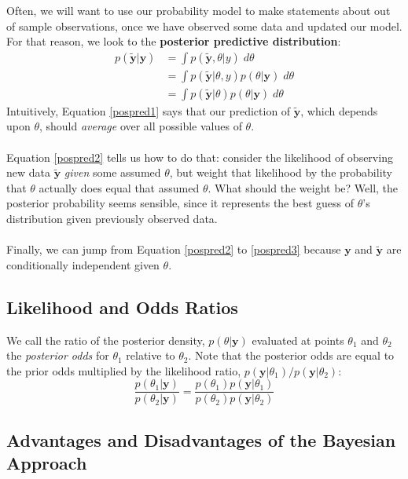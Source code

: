 \documentclass[12pt]{article}
\begin{document}
Often, we will want to use our probability model to make statements
about out of sample observations, once we have observed some data
and updated our model.  For that reason, we look to the
\textbf{posterior predictive distribution}:
\begin{align}
   p(\tilde{\mathbf{y}} | \mathbf{y}) &= \int p(\tilde{\mathbf{y}}, 
       \theta | y) \; d\theta \label{pospred1}\\
   &= \int p(\tilde{\mathbf{y}} | \theta , y) p(\theta | \mathbf{y})
       \; d\theta \label{pospred2}\\
   &= \int p(\tilde{\mathbf{y}} | 
      \theta) p(\theta | \mathbf{y} ) \; d\theta 
	\label{pospred3}
\end{align}
Intuitively, Equation \ref{pospred1} says that our prediction of 
$\tilde{\mathbf{y}}$, which depends upon $\theta$, 
should \emph{average} over all possible 
values of $\theta$.
\\
\\
Equation \ref{pospred2} tells us how
to do that: consider the likelihood of observing new 
data $\tilde{\mathbf{y}}$ \emph{given} some assumed $\theta$, 
but weight
that likelihood by the probability that $\theta$ actually does
equal that assumed $\theta$.  What should the weight be? Well,
the posterior probability seems sensible, since it represents
the best guess of $\theta$'s distribution given previously
observed data.
\\
\\
Finally, we can jump from Equation \ref{pospred2} to 
\ref{pospred3} because $\mathbf{y}$
and $\tilde{\mathbf{y}}$ are conditionally independent given 
$\theta$.

\subsection{Likelihood and Odds Ratios}

We call the ratio of the posterior density, $p(\theta | \mathbf{y})$ 
evaluated at points $\theta_1$ and $\theta_2$ the \emph{posterior odds}
for $\theta_1$ relative to $\theta_2$. Note that the posterior
odds are equal to the prior odds multiplied by the likelihood 
ratio, $p( \mathbf{y} | \theta_1)/p( \mathbf{y} | \theta_2)$:
   \[ \frac{p(\theta_1 | \mathbf{y})}{p(\theta_2 | \mathbf{y})}
      = \frac{p(\theta_1) p(\mathbf{y} | \theta_1)}{p(\theta_2)
	 p(\mathbf{y} | \theta_2)} \]


\subsection{Advantages and Disadvantages of the Bayesian Approach}
\end{document}

